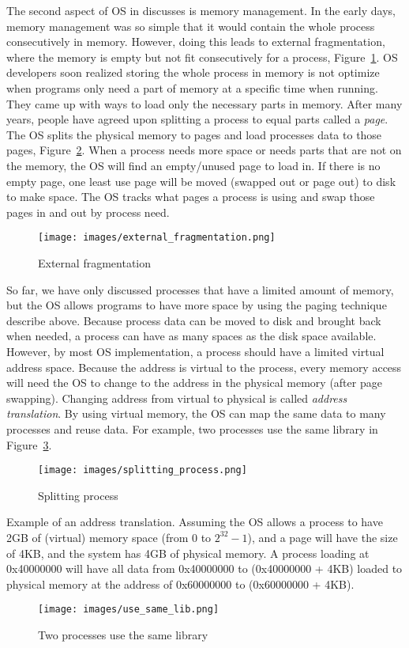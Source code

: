The second aspect of OS in discusses is memory management. In the early days, memory management was so simple that it would contain the whole process consecutively in memory. However, doing this leads to external fragmentation, where the memory is empty but not fit consecutively for a process, Figure~\ref{fig:externalfragmentation}. OS developers soon realized storing the whole process in memory is not optimize when programs only need a part of memory at a specific time when running. They came up with ways to load only the necessary parts in memory. After many years, people have agreed upon splitting a process to equal parts called a \textit{page}. The OS splits the physical memory to pages and load processes data to those pages, Figure~\ref{fig:splitprocess}. When a process needs more space or needs parts that are not on the memory, the OS will find an empty/unused page to load in. If there is no empty page, one least use page will be moved (swapped out or page out) to disk to make space. The OS tracks what pages a process is using and swap those pages in and out by process need.

\begin{figure}[H]
\centering
\caption{External fragmentation}
\label{fig:externalfragmentation}
\texttt{[image: images/external\_fragmentation.png]}
\end{figure}

So far, we have only discussed processes that have a limited amount of memory, but the OS allows programs to have more space by using the paging technique describe above. Because process data can be moved to disk and brought back when needed, a process can have as many spaces as the disk space available. However, by most OS implementation, a process should have a limited virtual address space. Because the address is virtual to the process, every memory access will need the OS to change to the address in the physical memory (after page swapping). Changing address from virtual to physical is called \textit{address translation}. By using virtual memory, the OS can map the same data to many processes and reuse data. For example, two processes use the same library in Figure~\ref{fig:samelib}.

\begin{figure}[H]
\centering
\caption{Splitting process}
\label{fig:splitprocess}
\texttt{[image: images/splitting\_process.png]}
\end{figure}

Example of an address translation. Assuming the OS allows a process to have 2GB of (virtual) memory space (from 0 to $2^{32}-1$), and a page will have the size of 4KB, and the system has 4GB of physical memory. A process loading at 0x40000000 will have all data from 0x40000000 to (0x40000000 + 4KB) loaded to physical memory at the address of 0x60000000 to (0x60000000 + 4KB).

\begin{figure}[H]
\centering
\caption{Two processes use the same library}
\label{fig:samelib}
\texttt{[image: images/use\_same\_lib.png]}
\end{figure}
